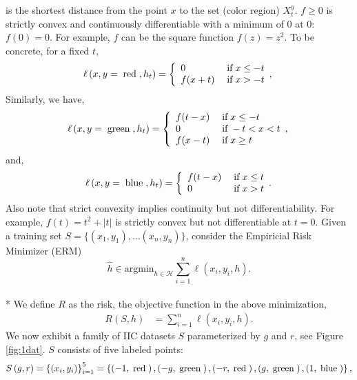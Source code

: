 \documentclass{article}
\def\H{\mathcal H}
\def\argmin{\mathrm{argmin}}
\begin{document}
 is the shortest distance from the point $x$ to the set (color region) $X^y_t$.
 $f \ge 0$ is strictly convex and continuously differentiable with a minimum of 0 at 0: $f(0) = 0$.
 For example, $f$ can be the square function $f(z)=z^2$.
To be concrete, for a fixed $t, $
\begin{equation} \ell\left(x, y = \text{\;red\;}, h_{t}\right) =\left\{ \begin{array}{ll}
0& \text{\;if\;} x \leq  -t \\
f(x + t)& \text{\;if\;} x > -t \\
\end{array},\right. \end{equation}
Similarly, we have,
\begin{equation} \ell\left(x, y = \text{\;green\;}, h_{t}\right) =\left\{ \begin{array}{ll}
f(t - x)& \text{\;if\;} x \leq  -t \\
0& \text{\;if\;} -t < x < t \\
f(x - t)& \text{\;if\;} x \geq  t \\
\end{array},\right. \end{equation}
and,
\begin{equation} \ell\left(x, y = \text{\;blue\;}, h_{t}\right) =\left\{ \begin{array}{ll}
f(t - x)& \text{\;if\;} x \leq  t \\
0& \text{\;if\;} x > t \\
\end{array}.\right. \end{equation}
Also note that strict convexity implies continuity but not differentiability. For example, $f\left(t\right)  = t^{2} + \left| t \right|$ is strictly convex but not differentiable at $t  = 0$.
 Given a training set $S=\{(x_1,y_1), \ldots (x_n, y_n)\}$, consider the Empiricial Risk Minimizer (ERM)
 \begin{equation}
 \hat h \in \argmin_{h \in \H} \sum_{i=1}^n \ell(x_i, y_i, h).
 \end{equation}
\\* We define $R $ as the risk, the objective function in the above minimization,
\begin{align*}
R\left(S, h\right)  &= \displaystyle\sum_{i=1}^{n} \ell\left(x_{i}, y_{i}, h\right).
\end{align*}
We now exhibit a family of IIC datasets $S $ parameterized by $g $ and $r $, see Figure \ref{fig:1dat}. $S $ consists of five labeled points:
\begin{equation} 
S\left(g, r\right)  = \left\{\left(x_{i}, y_{i}\right)\right\}_{i=1}^{5} = \left\{\left(-1, \text{\;red\;}\right), \left(-g, \text{\;green\;}\right), \left(-r, \text{\;red\;}\right), \left(g, \text{\;green\;}\right), \left(1, \text{\;blue\;}\right)\right\},
\end{equation}
\end{document}
